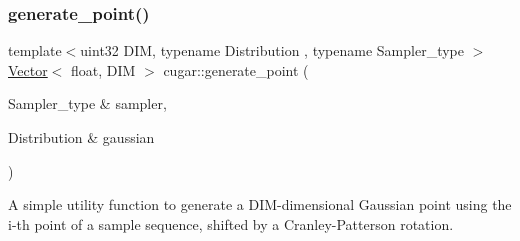 \subsubsection{\texorpdfstring{generate\+\_\+point()}{generate\_point()}}
{\footnotesize\ttfamily template$<$uint32 D\+IM, typename Distribution , typename Sampler\+\_\+type $>$ \\
\hyperlink{structcugar_1_1_vector}{Vector}$<$ float, D\+IM $>$ cugar\+::generate\+\_\+point (\begin{DoxyParamCaption}\item[{Sampler\+\_\+type \&}]{sampler,  }\item[{Distribution \&}]{gaussian }\end{DoxyParamCaption})}

A simple utility function to generate a D\+I\+M-\/dimensional Gaussian point using the i-\/th point of a sample sequence, shifted by a Cranley-\/\+Patterson rotation. 